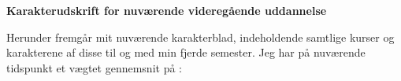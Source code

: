 \documentclass[../Ansoegning.tex]{subfiles}
\begin{document}
\begin{center}
    \Large{\textbf{Karakterudskrift for nuværende videregående uddannelse}}\vspace{-0.7cm}
\end{center}
Herunder fremgår mit nuværende karakterblad, indeholdende samtlige kurser og karakterene af disse til og med min fjerde semester. Jeg har på nuværende tidspunkt et vægtet gennemsnit på \avgKar:
\begin{minipage}{1\textwidth}

\end{minipage}
    \newpage
\begin{minipage}{1\textwidth}

\end{minipage}
\end{document}
